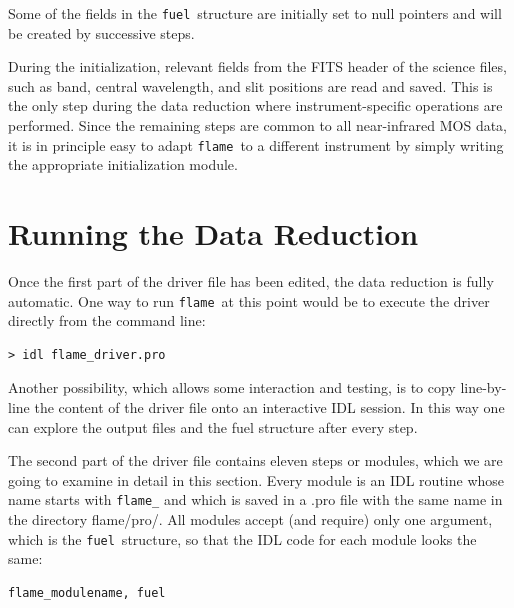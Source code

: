 \documentclass[a4paper, notitlepage]{article}
\newcommand{\flame}{\texttt{flame}}
\newcommand{\fuel}{\texttt{fuel}}
\begin{document}
Some of the fields in the \fuel\ structure are initially set to null pointers and will be created by successive steps.

During the initialization, relevant fields from the FITS header of the science files, such as band, central wavelength, and slit positions are read and saved. This is the only step during the data reduction where instrument-specific operations are performed. Since the remaining steps are common to all near-infrared MOS data, it is in principle easy to adapt \flame\ to a different instrument by simply writing the appropriate initialization module.








\section{Running the Data Reduction}
\label{sec:data_reduction}

Once the first part of the driver file has been edited, the data reduction is fully automatic. One way to run \flame\ at this point would be to execute the driver directly from the command line:
\begin{lstlisting}
> idl flame_driver.pro
\end{lstlisting}
Another possibility, which allows some interaction and testing, is to copy line-by-line the content of the driver file onto an interactive IDL session. In this way one can explore the output files and the fuel structure after every step.

The second part of the driver file contains eleven steps or modules, which we are going to examine in detail in this section. Every module is an IDL routine whose name starts with \texttt{flame\_} and which is saved in a .pro file with the same name in the directory flame/pro/. All modules accept (and require) only one argument, which is the \fuel\ structure, so that the IDL code for each module looks the same:
\begin{lstlisting}
flame_modulename, fuel
\end{lstlisting}
\end{document}
